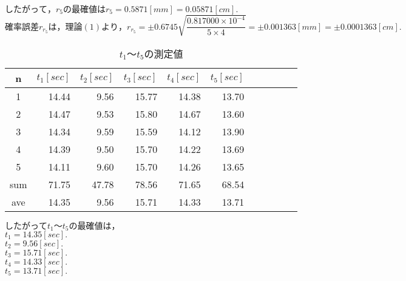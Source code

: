 \documentclass[a4paper,1pt]{jsarticle}
\begin{document}
$したがって，r_5の最確値はr_5=0.5871[mm]=0.05871[cm].$\\

$確率誤差r_{r_5}は，理論(1)より，r_{r_5}=\pm0.6745\sqrt{\dfrac{0.817000\times10^{-4}}{5\times4}}=\pm0.001363[mm]=\pm0.0001363[cm].$


\begin{table}[H]
  \caption{$t_1〜t_5$の測定値}
  \label{table:SpeedOfLight}
  \centering
  \begin{tabular}{|c||r|r|r|r|r|r|r|r|r|r|}
    \hline
    n & $t_1[sec]$ & $t_2[sec]$ & $t_3[sec]$ & $t_4[sec]$ & $t_5[sec]$ \\

    \hline\hline
    1 & 14.44 & 9.56 & 15.77 & 14.38 & 13.70 \\
    2 & 14.47 & 9.53 & 15.80 & 14.67 & 13.60 \\
    3 & 14.34 & 9.59 & 15.59 & 14.12 & 13.90 \\
    4 & 14.39 & 9.50 & 15.70 & 14.22 & 13.69 \\
    5 & 14.11 & 9.60 & 15.70 & 14.26 & 13.65 \\

    \hline\hline
    sum & 71.75 & 47.78 & 78.56 & 71.65 & 68.54 \\
    \hline
    ave & 14.35 & 9.56 & 15.71 & 14.33 & 13.71 \\

    \hline
  \end{tabular}


\end{table}

$したがってt_1〜t_5の最確値は，$\\

$t_1=14.35[sec].$\\

$t_2=9.56[sec].$\\

$t_3=15.71[sec].$\\

$t_4=14.33[sec].$\\

$t_5=13.71[sec].$\\
\end{document}
